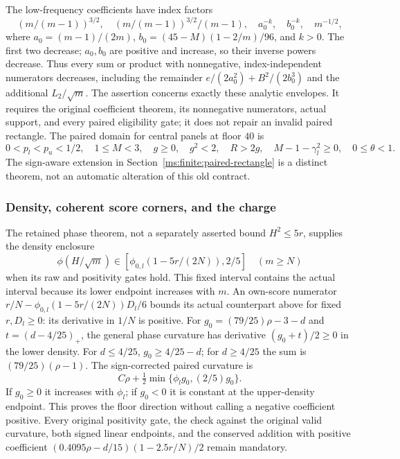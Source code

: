 The low-frequency coefficients have index factors
\[
 (m/(m-1))^{3/2},\quad (m/(m-1))^{3/2}/(m-1),\quad
 a_0^{-k},\quad b_0^{-k},\quad m^{-1/2},
\]
where $a_0=(m-1)/(2m)$, $b_0=(45-M)(1-2/m)/96$, and $k>0$.
The first two decrease; $a_0,b_0$ are positive and increase, so their
inverse powers decrease. Thus every sum or product with nonnegative,
index-independent numerators decreases, including the remainder
$e/(2a_0^2)+B^2/(2b_0^3)$ and the additional $L_2/\sqrt m$.
The assertion concerns exactly these analytic envelopes. It requires the
original coefficient theorem, its nonnegative numerators, actual support,
and every paired eligibility gate; it does not repair an invalid paired
rectangle. The paired domain for central panels at floor $40$ is
\[
 0<p_l<p_u<1/2,\quad1\le M<3,\quad g\ge0,\quad g^2<2,
 \quad R>2g,\quad M-1-\gamma_l^2\ge0,\quad0\le\theta<1.
\]
The sign-aware extension in Section~\ref{ms:finite:paired-rectangle}
is a distinct theorem, not an automatic alteration of this old contract.

\subsubsection{Density, coherent score corners, and the charge}
\label{ms:finite:floor-phase}
The retained phase theorem, not a separately asserted bound $H^2\le5r$,
supplies the density enclosure
\[
 \phi(H/\sqrt m)\in[\phi_{0,l}(1-5r/(2N)),2/5]
 \quad(m\ge N)
\]
when its raw and positivity gates hold. This fixed interval contains the
actual interval because its lower endpoint increases with $m$.
An own-score numerator
$r/N-\phi_{0,l}(1-5r/(2N))D_l/6$ bounds its actual counterpart above
for fixed $r,D_l\ge0$: its derivative in $1/N$ is positive.
For $g_0=(79/25)\rho-3-d$ and $t=(d-4/25)_+$, the general phase
curvature has derivative $(g_0+t)/2\ge0$ in the lower density.
For $d\le4/25$, $g_0\ge4/25-d$; for $d\ge4/25$ the sum is
$(79/25)(\rho-1)$. The sign-corrected paired curvature is
\begin{equation}\label{ms:finite:signed-curvature}
 C\rho+\tfrac12\min\{\phi_lg_0,(2/5)g_0\}.
\end{equation}
If $g_0\ge0$ it increases with $\phi_l$; if $g_0<0$ it is constant
at the upper-density endpoint. This proves the floor direction without
calling a negative coefficient positive. Every original positivity gate,
the check against the original valid curvature, both signed linear endpoints,
and the conserved addition with positive coefficient
$(0.4095\rho-d/15)(1-2.5r/N)/2$ remain mandatory.


